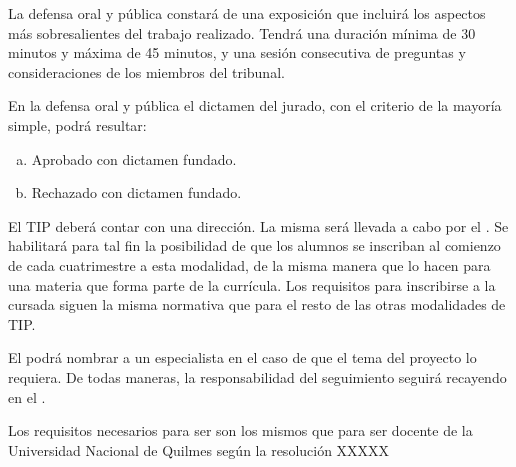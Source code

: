\articulo La defensa oral y pública constará de una exposición que incluirá
los aspectos más sobresalientes del trabajo realizado. Tendrá una duración mínima de
30 minutos y máxima de 45 minutos, y una sesión consecutiva de preguntas y
consideraciones de los miembros del tribunal.

\articulo En la defensa oral y pública el dictamen del jurado, con el criterio
de la mayoría simple, podrá resultar: 
\begin{enumerate}[a.]
\item Aprobado con dictamen fundado.
\item Rechazado con dictamen fundado.
\end{enumerate}







\articulo El TIP deberá contar con una dirección. La misma será llevada a
cabo por el \profesorTIP{}. Se habilitará para tal fin la posibilidad de que los alumnos 
se inscriban al comienzo de cada cuatrimestre a esta modalidad, de la misma manera que lo 
hacen para una materia que forma parte de la currícula. Los requisitos para inscribirse a 
la cursada siguen la misma normativa que para el resto de las otras modalidades de TIP.

\articulo El \profesorTIP{}  podrá nombrar a un especialista en el caso de que el
tema del proyecto lo requiera. De todas maneras, la responsabilidad del seguimiento seguirá recayendo
en el \profesorTIP{}.

\articulo Los requisitos necesarios para ser \profesorTIP{} son los mismos que para ser docente
de la Universidad Nacional de Quilmes según la resolución XXXXX %

